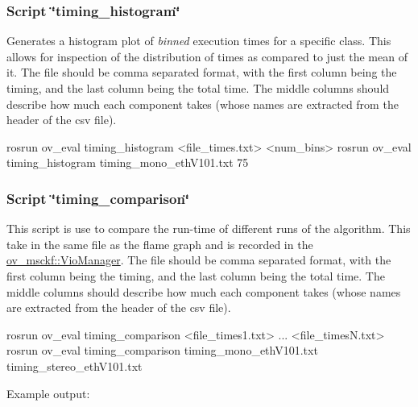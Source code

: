 \hypertarget{eval-timing_eval-ov-timing-hist}{}\subsubsection{Script \char`\"{}timing\+\_\+histogram\char`\"{}}\label{eval-timing_eval-ov-timing-hist}
Generates a histogram plot of {\itshape binned} execution times for a specific class. This allows for inspection of the distribution of times as compared to just the mean of it. The file should be comma separated format, with the first column being the timing, and the last column being the total time. The middle columns should describe how much each component takes (whose names are extracted from the header of the csv file).


\begin{DoxyCode}
rosrun ov\_eval timing\_histogram <file\_times.txt> <num\_bins>
rosrun ov\_eval timing\_histogram timing\_mono\_ethV101.txt 75
\end{DoxyCode}


\hypertarget{eval-timing_eval-ov-timing-compare}{}\subsubsection{Script \char`\"{}timing\+\_\+comparison\char`\"{}}\label{eval-timing_eval-ov-timing-compare}
This script is use to compare the run-\/time of different runs of the algorithm. This take in the same file as the flame graph and is recorded in the \hyperlink{classov__msckf_1_1VioManager}{ov\+\_\+msckf\+::\+Vio\+Manager}. The file should be comma separated format, with the first column being the timing, and the last column being the total time. The middle columns should describe how much each component takes (whose names are extracted from the header of the csv file).


\begin{DoxyCode}
rosrun ov\_eval timing\_comparison <file\_times1.txt> ... <file\_timesN.txt>
rosrun ov\_eval timing\_comparison timing\_mono\_ethV101.txt timing\_stereo\_ethV101.txt
\end{DoxyCode}


Example output\+:


